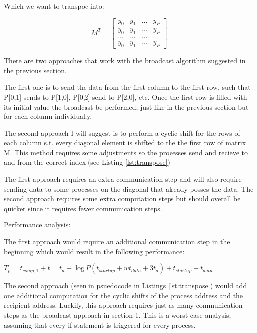 \documentclass[a4paper]{exam}
\begin{document}
\begin{questions}
\begin{solution}
  Which we want to transpoe into:

\begin{equation*} M^T =
  \begin{bmatrix}
    y_0 & y_1 & ... &y_P\\
    y_0 & y_1 & ... &y_P\\
    ... & ... & ... &...\\
    y_0 & y_1 & ... &y_P
  \end{bmatrix}
\end{equation*}

There are two approaches that work with the broadcast algorithm suggested in the previous section.

The first one is to send the data from the first column to the first row, such that P[0,1] sends to P[1,0], P[0,2] send to P[2,0], etc. Once the first row is filled with its initial value the broadcast be performed, just like in the previous section but for each column individually.

The second approach I will suggest is to perform a cyclic shift for the rows of each column s.t. every diagonal element is shifted to the the first row of matrix M. This method requires some adjustments so the processes send and recieve to and from the correct index (see Listing \ref{lst:transpose})

The first approach requires an extra communication step and will also require sending data to some processes on the diagonal that already posses the data. The second approach requires some extra computation steps but should overall be quicker since it requires fewer communication steps.
\end{solution}



\addpoints \question Performance analysis:

The first approach would require an additional communication step in the beginning which would result in the following performance:

$T_p = t_{comp,1} + t = t_a + \log P(t_{startup} + wt_{data} + 3t_a) + t_{startup} + t_{data}$

The second approach (seen in psuedocode in Listings \ref{lst:transpose}) would add one additional computation for the cyclic shifts of the process address and the recipient address. Luckily, this approach requires just as many communication steps as the broadcast approach in section 1. This is a worst case analysis, assuming that every if statement is triggered for every process.


\end{questions}
\end{document}
